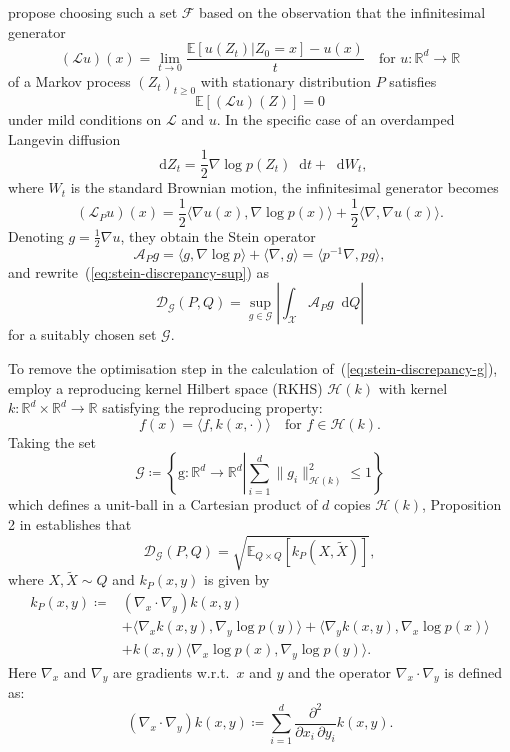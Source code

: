 \documentclass[12pt,a4paper]{report}
\newcommand*\diff{\mathop{}\!\mathrm{d}}
\begin{document}
\cite{gorhamMeasuringSampleQuality2015} propose choosing such a set $\mathcal{F}$ based on the observation that the infinitesimal generator
$$(\mathcal{L}u)(x) = \lim_{t \to 0} \frac{\mathbb{E}[u(Z_t) | Z_0 = x] - u(x)}{t} \quad \text{for } u:\mathbb{R}^d \to \mathbb{R}$$
of a Markov process $(Z_t)_{t \geq 0}$ with stationary distribution $P$ satisfies 
$$\mathbb{E}[(\mathcal{L} u)(Z)] = 0$$
under mild conditions on $\mathcal{L}$ and $u$. In the specific case of an overdamped Langevin diffusion
$$\diff Z_t = \frac{1}{2} \nabla \log p(Z_t) \diff t + \diff W_t,$$
where $W_t$ is the standard Brownian motion, the infinitesimal generator becomes
$$(\mathcal{L}_P u)(x) = \frac{1}{2} \langle \nabla u(x), \nabla \log p(x)\rangle + \frac{1}{2}\langle \nabla, \nabla u(x) \rangle.$$
Denoting $g  = \frac{1}{2}\nabla u$, they obtain the Stein operator
\begin{equation}
\mathcal{A}_P g = \langle g, \nabla \log p \rangle + \langle \nabla, g \rangle = \langle p^{-1}\nabla, p g \rangle,
\end{equation}
and rewrite~(\ref{eq:stein-discrepancy-sup}) as
\begin{equation}
\mathcal{D}_{\mathcal{G}}(P, Q) = \sup_{g \in \mathcal{G}}\left|\int_\mathcal{X} \mathcal{A}_P g \diff Q \right|
\label{eq:stein-discrepancy-g}
\end{equation}
for a suitably chosen set $\mathcal{G}$.

To remove the optimisation step in the calculation of~(\ref{eq:stein-discrepancy-g}), \cite{gorhamMeasuringSampleQuality2017} employ a reproducing kernel Hilbert space (RKHS) $\mathcal{H}(k)$ with kernel $k: \mathbb{R}^d \times \mathbb{R}^d \to \mathbb{R}$ satisfying the reproducing property:
$$f(x) = \langle f, k(x, \cdot)\rangle \quad\text{for } f \in \mathcal{H}(k).$$
Taking the set
$$\mathcal{G} \coloneq \left\{ \mathrm{g} : \mathbb{R}^d \to \mathbb{R}^d \left| \sum_{i=1}^d \|g_i\|^2_{\mathcal{H}(k)} \leq 1 \right.\right\}$$
which defines a unit-ball in a Cartesian product of $d$ copies $\mathcal{H}(k)$, Proposition 2 in \cite{gorhamMeasuringSampleQuality2017} establishes that
\begin{equation}
\mathcal{D}_{\mathcal{G}}(P, Q) = \sqrt{\mathbb{E}_{Q \times Q}[k_P(X, \tilde{X})]},
\label{eq:stein-discrepancy-sqrt-expectation}
\end{equation}
where $X, \tilde{X} \sim Q$ and $k_P(x, y)$ is given by
\begin{equation}
\begin{aligned}
k_P(x, y) \coloneq 
&(\nabla_x\cdot\nabla_y) k(x,y) \\
&+ \langle \nabla_x k(x, y), \nabla_y \log p(y) \rangle + \langle \nabla_y k(x, y), \nabla_x \log p(x) \rangle \\
&+ k(x, y) \langle \nabla_x \log p(x), \nabla_y \log p(y) \rangle.
\label{eq:deriv:stein-kernel}
\end{aligned}
\end{equation}
Here $\nabla_x$ and $\nabla_y$ are gradients w.r.t.\ $x$ and $y$ and the operator $\nabla_x\cdot\nabla_y$ is defined as:
$$(\nabla_x\cdot\nabla_y) k(x,y) \coloneq \sum_{i=1}^d \frac{\partial^2}{\partial x_i\, \partial y_i} k(x, y).$$
\end{document}

